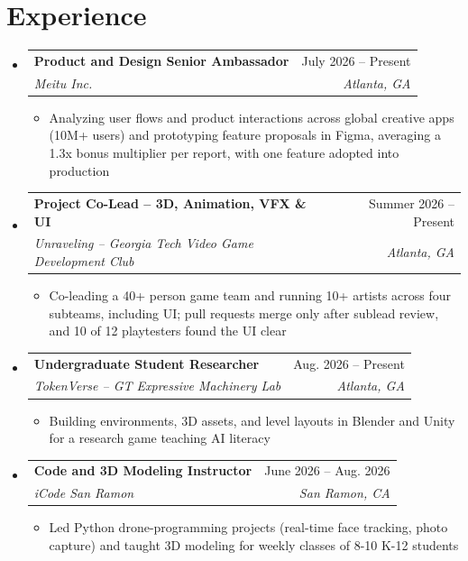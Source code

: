 \documentclass[letterpaper,11pt]{article}
\makeatletter
\newcommand{\resumeItem}[1]{
  \item\small{
    {#1 \vspace{-2pt}}
  }
}
\newcommand{\resumeSubheading}[4]{
  \vspace{-2pt}\item
    \begin{tabular*}{0.97\textwidth}[t]{l@{\extracolsep{\fill}}r}
      \textbf{#1} & #2 \\
      \textit{\small#3} & \textit{\small #4} \\
    \end{tabular*}\vspace{-7pt}
}
\newcommand{\resumeSubHeadingListStart}{\begin{itemize}[leftmargin=0.15in, label={}]}
\newcommand{\resumeSubHeadingListEnd}{\end{itemize}}
\newcommand{\resumeItemListStart}{\begin{itemize}}
\newcommand{\resumeItemListEnd}{\end{itemize}\vspace{-5pt}}
\makeatother
\begin{document}
\section{Experience}
  \resumeSubHeadingListStart

    \resumeSubheading
      {Product and Design Senior Ambassador}{July 2026 -- Present}
      {Meitu Inc.}{Atlanta, GA}
      \resumeItemListStart
        \resumeItem{Analyzing user flows and product interactions across global creative apps (10M+ users) and prototyping feature proposals in Figma, averaging a 1.3x bonus multiplier per report, with one feature adopted into production}
      \resumeItemListEnd

    \resumeSubheading
      {Project Co-Lead -- 3D, Animation, VFX \& UI}{Summer 2026 -- Present}
      {Unraveling -- Georgia Tech Video Game Development Club}{Atlanta, GA}
      \resumeItemListStart
        \resumeItem{Co-leading a 40+ person game team and running 10+ artists across four subteams, including UI; pull requests merge only after sublead review, and 10 of 12 playtesters found the UI clear}
      \resumeItemListEnd

    \resumeSubheading
      {Undergraduate Student Researcher}{Aug. 2026 -- Present}
      {TokenVerse -- GT Expressive Machinery Lab}{Atlanta, GA}
      \resumeItemListStart
        \resumeItem{Building environments, 3D assets, and level layouts in Blender and Unity for a research game teaching AI literacy}
      \resumeItemListEnd

    \resumeSubheading
      {Code and 3D Modeling Instructor}{June 2026 -- Aug. 2026}
      {iCode San Ramon}{San Ramon, CA}
      \resumeItemListStart
        \resumeItem{Led Python drone-programming projects (real-time face tracking, photo capture) and taught 3D modeling for weekly classes of 8-10 K-12 students}
      \resumeItemListEnd

  \resumeSubHeadingListEnd
\end{document}
